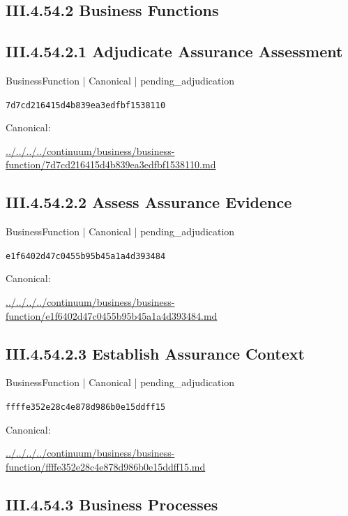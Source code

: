 \documentclass[10pt,a4paper]{article}
\begin{document}
\subsection*{III.4.54.2 Business Functions}
\subsection*{III.4.54.2.1 Adjudicate Assurance Assessment}
{\small BusinessFunction | Canonical | pending\_adjudication}\par
\texttt{7d7cd216415d4b839ea3edfbf1538110}\par
Canonical: \par
{\footnotesize\url{../../../../continuum/business/business-function/7d7cd216415d4b839ea3edfbf1538110.md}}\par
\subsection*{III.4.54.2.2 Assess Assurance Evidence}
{\small BusinessFunction | Canonical | pending\_adjudication}\par
\texttt{e1f6402d47c0455b95b45a1a4d393484}\par
Canonical: \par
{\footnotesize\url{../../../../continuum/business/business-function/e1f6402d47c0455b95b45a1a4d393484.md}}\par
\subsection*{III.4.54.2.3 Establish Assurance Context}
{\small BusinessFunction | Canonical | pending\_adjudication}\par
\texttt{ffffe352e28c4e878d986b0e15ddff15}\par
Canonical: \par
{\footnotesize\url{../../../../continuum/business/business-function/ffffe352e28c4e878d986b0e15ddff15.md}}\par
\subsection*{III.4.54.3 Business Processes}
\end{document}
